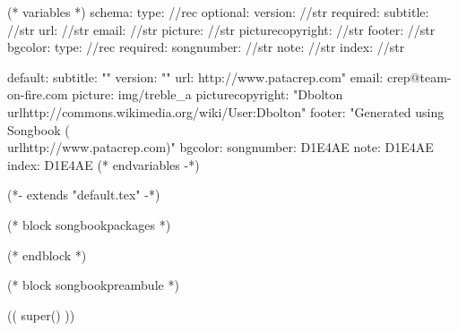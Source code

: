 
(* variables *)
schema:
  type: //rec
  optional:
    version: //str
  required:
    subtitle: //str
    url: //str
    email: //str
    picture: //str
    picturecopyright: //str
    footer: //str
    bgcolor:
      type: //rec
      required:
        songnumber: //str
        note: //str
        index: //str

default:
  subtitle: ""
  version: ""
  url: http://www.patacrep.com"
  email: crep@team-on-fire.com
  picture: img/treble_a
  picturecopyright: "Dbolton \\url{http://commons.wikimedia.org/wiki/User:Dbolton}"
  footer: "Generated using Songbook (\\url{http://www.patacrep.com})"
  bgcolor:
    songnumber: D1E4AE
    note: D1E4AE
    index: D1E4AE
(* endvariables -*)

(*- extends "default.tex" -*)

(* block songbookpackages *)
\usepackage[
    (* for option in bookoptions *)((option)),
    (* endfor *)
    ]{crepbook}
(* endblock *)

(* block songbookpreambule *)
\usepackage[
     a4paper %
     ,includeheadfoot %
     ,hmarginratio=1:1 %
     ,outer=1.8cm %
     ,vmarginratio=1:1 %
     ,bmargin=1.3cm %
     ]{geometry}

(( super() ))

\pagestyle{empty}


